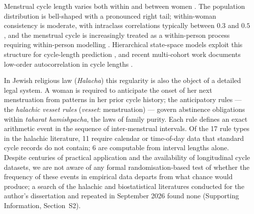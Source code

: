 \documentclass[12pt]{article}
\begin{document}
Menstrual cycle length varies both within and between women
\citep{munster1992,creinin2004,harlow2000,bull2019}. The population distribution is
bell-shaped with a pronounced right tail; within-woman consistency is moderate, with
intraclass correlations typically between $0.3$ and $0.5$ \citep{dasharathy2012}, and
the menstrual cycle is increasingly treated as a within-person process requiring
within-person modelling \citep{schmalenberger2021}. Hierarchical state-space models
exploit this structure for cycle-length prediction \citep{bortot2010}, and recent
multi-cohort work documents low-order autocorrelation in cycle lengths
\citep{ecochard2024}.

In Jewish religious law (\textit{Halacha}) this regularity is also the object of a
detailed legal system. A woman is required to anticipate the onset of her next
menstruation from patterns in her prior cycle history; the anticipatory rules --- the
\textit{halachic vesset rules} (\textit{vesset}: menstruation) --- govern abstinence
obligations within \textit{taharat hamishpacha}, the laws of family purity. Each rule
defines an exact arithmetic event in the sequence of inter-menstrual intervals. Of the 17
rule types in the halachic literature, 11 require calendar or time-of-day data that
standard cycle records do not contain; 6 are computable from interval lengths alone.
Despite centuries of practical application and the availability of longitudinal cycle
datasets, we are not aware of any formal randomisation-based test of whether the
frequency of these events in empirical data departs from what chance would produce; a
search of the halachic and biostatistical literatures conducted for the author's
dissertation and repeated in September 2026 found none (Supporting Information,
Section~S2).
\end{document}
